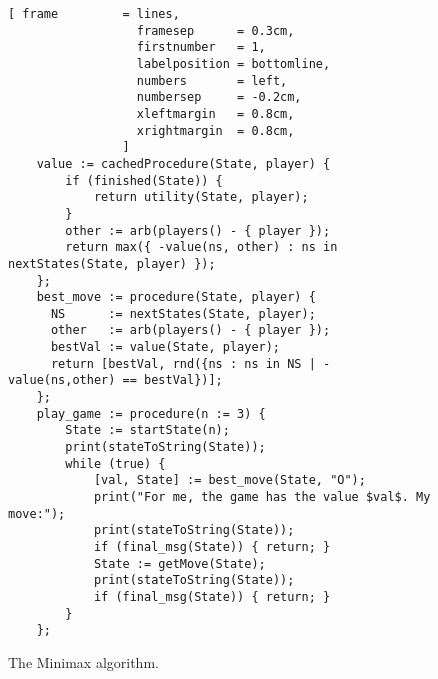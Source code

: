 \begin{figure}[!ht]
\centering
\begin{Verbatim}[ frame         = lines, 
                  framesep      = 0.3cm, 
                  firstnumber   = 1,
                  labelposition = bottomline,
                  numbers       = left,
                  numbersep     = -0.2cm,
                  xleftmargin   = 0.8cm,
                  xrightmargin  = 0.8cm,
                ]
    value := cachedProcedure(State, player) {
        if (finished(State)) {
            return utility(State, player);
        }
        other := arb(players() - { player });
        return max({ -value(ns, other) : ns in nextStates(State, player) });
    };
    best_move := procedure(State, player) {
      NS      := nextStates(State, player);
      other   := arb(players() - { player });
      bestVal := value(State, player);
      return [bestVal, rnd({ns : ns in NS | -value(ns,other) == bestVal})];
    };
    play_game := procedure(n := 3) {
        State := startState(n);
        print(stateToString(State));
        while (true) {
            [val, State] := best_move(State, "O");
            print("For me, the game has the value $val$. My move:");
            print(stateToString(State));
            if (final_msg(State)) { return; }
            State := getMove(State);
            print(stateToString(State));
            if (final_msg(State)) { return; }
        }
    };
\end{Verbatim}
\vspace*{-0.3cm}
\caption{The Minimax algorithm.}
\label{fig:game.stlx}
\end{figure}
